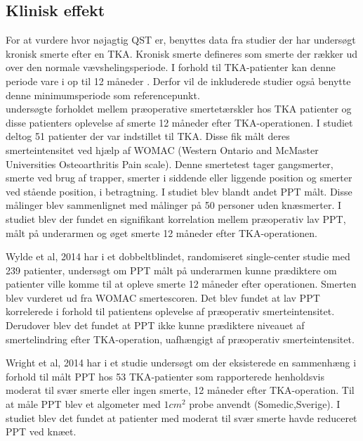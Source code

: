 \subsection{Klinisk effekt}
For at vurdere hvor nøjagtig QST er, benyttes data fra studier der har undersøgt kronisk smerte efter en TKA. Kronisk smerte defineres som smerte der rækker ud over den normale vævshelingsperiode. I forhold til TKA-patienter kan denne periode vare i op til 12 måneder \citep{Wylde2016review}. Derfor vil de inkluderede studier også benytte denne minimumsperiode som referencepunkt. \\

 undersøgte forholdet mellem præoperative smertetærskler hos TKA patienter og disse patienters oplevelse af smerte 12 måneder efter TKA-operationen. I studiet deltog 51 patienter der var indstillet til TKA. Disse fik målt deres smerteintensitet ved hjælp af WOMAC (Western Ontario and McMaster Universities Osteoarthritis Pain scale). Denne smertetest tager gangsmerter, smerte ved brug af trapper, smerter i siddende eller liggende position og smerter ved stående position, i betragtning.  I studiet blev blandt andet PPT målt. Disse målinger blev sammenlignet med målinger på 50 personer uden knæsmerter. I studiet blev der fundet en signifikant korrelation mellem præoperativ lav PPT, målt på underarmen og øget smerte 12 måneder efter TKA-operationen.

Wylde et al, 2014 har i et dobbeltblindet, randomiseret single-center studie med 239 patienter, undersøgt om PPT målt på underarmen kunne prædiktere om patienter ville komme til at opleve smerte 12 måneder efter operationen. Smerten blev vurderet ud fra WOMAC smertescoren. Det blev fundet at lav PPT korrelerede i forhold til patientens oplevelse af præoperativ smerteintensitet. Derudover blev det fundet at PPT ikke kunne prædiktere niveauet af smertelindring efter TKA-operation, uafhængigt af præoperativ smerteintensitet.

Wright et al, 2014 har i et studie undersøgt om der eksisterede en sammenhæng i forhold til målt PPT hos 53 TKA-patienter som rapporterede henholdsvis moderat til svær smerte eller ingen smerte, 12 måneder efter TKA-operation. Til at måle PPT blev et algometer med $1 cm^{2}$ probe anvendt (Somedic,Sverige). I studiet blev det fundet at patienter med moderat til svær smerte havde reduceret PPT ved knæet.


